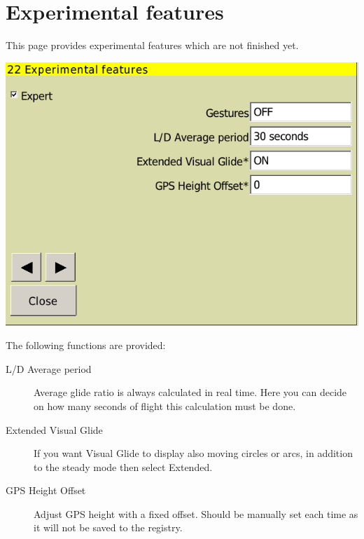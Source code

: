 \documentclass[a4paper,12pt]{refrep}
\begin{document}




\clearpage
\section{Experimental features}

This page provides experimental features which are not finished yet.

\begin{center}
\includegraphics[angle=0,width=\linewidth,keepaspectratio='true']{figures/config-exp.png}
\end{center}

The following functions are provided:
\begin{description}
\item[L/D Average period] Average glide ratio is always calculated in real time. Here you can decide 
on how many seconds of flight this calculation must be done.
\item[Extended Visual Glide] If you want Visual Glide to display also moving circles or arcs, in 
addition to the steady mode then select Extended.
\item[GPS Height Offset] Adjust GPS height with a fixed offset. Should be manually set each time 
as it will not be saved to the registry.
\end{description}
\end{document}
